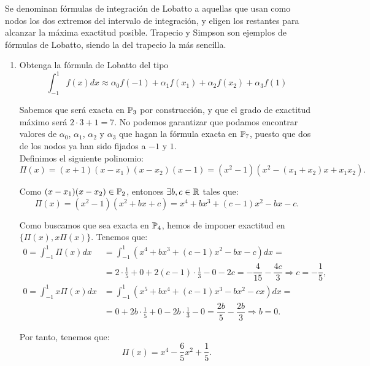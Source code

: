 \begin{ejercicio}\label{ej:2.1.29}
    Se denominan fórmulas de integración de Lobatto a aquellas que usan como nodos los dos extremos del intervalo de integración, y eligen los restantes para alcanzar la máxima exactitud posible. Trapecio y Simpson son ejemplos de fórmulas de Lobatto, siendo la del trapecio la más sencilla.
    \begin{enumerate}
        \item Obtenga la fórmula de Lobatto del tipo $$\int_{-1}^{1} f(x) dx \approx \alpha_0 f(-1) + \alpha_1 f(x_1) + \alpha_2 f(x_2) + \alpha_3 f(1)$$
        
        Sabemos que será exacta en $\mathbb{P}_3$ por construcción, y que el grado de exactitud máximo será $2\cdot 3 + 1 = 7$. No podemos garantizar que podamos encontrar valores de $\alpha_0$, $\alpha_1$, $\alpha_2$ y $\alpha_3$ que hagan la fórmula exacta en $\mathbb{P}_7$, puesto que dos de los nodos ya han sido fijados a $-1$ y $1$.\\
        Definimos el siguiente polinomio:
        \begin{equation*}
            \Pi(x) = (x+1)(x-x_1)(x-x_2)(x-1) = (x^2-1)(x^2-(x_1+x_2)x + x_1x_2).
        \end{equation*}

        Como $(x-x_1)(x-x_2)\in \mathbb{P}_2$, entonces $\exists b,c\in \mathbb{R}$ tales que:
        \begin{equation*}
            \Pi(x) = (x^2-1)(x^2 + bx + c)
            = x^4 + bx^3 + (c-1)x^2 - bx - c.
        \end{equation*}

        Como buscamos que sea exacta en $\mathbb{P}_4$, hemos de imponer exactitud en $\{\Pi(x), x\Pi(x)\}$. Tenemos que:
        \begin{align*}
            0 = \int_{-1}^{1} \Pi(x) dx &= \int_{-1}^{1} (x^4 + bx^3 + (c-1)x^2 - bx - c) dx =\\&= 2\cdot \frac{1}{5} + 0 + 2(c-1)\cdot \frac{1}{3} - 0 - 2c = -\dfrac{4}{15} - \dfrac{4c}{3}
            \Longrightarrow c = -\dfrac{1}{5},\\
            0 = \int_{-1}^{1} x\Pi(x) dx &= \int_{-1}^{1} (x^5 + bx^4 + (c-1)x^3 - bx^2 - cx) dx =\\&= 0 + 2b\cdot \frac{1}{5} + 0 -2b\cdot \frac{1}{3} - 0 = \dfrac{2b}{5} - \dfrac{2b}{3} \Longrightarrow b = 0.
        \end{align*}

        Por tanto, tenemos que:
        \begin{equation*}
            \Pi(x) = x^4 - \dfrac{6}{5}x^2 + \dfrac{1}{5}.
        \end{equation*}


\end{enumerate}
\end{ejercicio}
